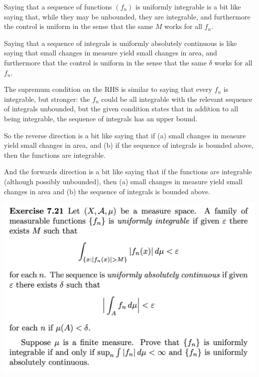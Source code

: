 \begin{intuition*}
  Saying that a sequence of functions $(f_n)$ is uniformly integrable is a bit like saying that, while they may
  be unbounded, they are integrable, and furthermore the control is uniform in the sense that the same $M$
  works for all $f_n$.

  Saying that a sequence of integrals is uniformly absolutely continuous is like saying that small changes in
  measure yield small changes in area, and furthermore that the control is uniform in the sense that the
  same $\delta$ works for all $f_n$.

  The supremum condition on the RHS is similar to saying that every $f_n$ is integrable, but stronger:
  the $f_n$ could be all integrable with the relevant sequence of integrals unbounded, but the given condition
  states that in addition to all being integrable, the sequence of integrals has an upper bound.

  So the reverse direction is a bit like saying that if (a) small changes in measure yield small changes in
  area, and (b) if the sequence of integrals is bounded above, then the functions are integrable.

  And the forwards direction is a bit like saying that if the functions are integrable (although possibly
  unbounded), then (a) small changes in measure yield small changes in area and (b) the sequence of integrals
  is bounded above.
\end{intuition*}

\begin{mdframed}
\includegraphics[width=400pt]{img/analysis--berkeley-202a-hw08-337f.png}
\end{mdframed}

